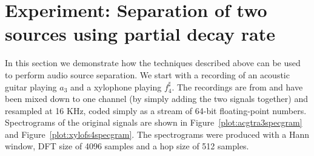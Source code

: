 \documentclass[letterpaper,12pt]{report}
\begin{document}
\section{Experiment: Separation of two sources using partial decay rate}

In this section we demonstrate how the techniques described above can be used to
perform audio source separation. We start with a recording of an acoustic guitar
playing $a_{3}$ and a xylophone playing $f_{4}^{\sharp}$. The recordings are
from \cite{opolko1987mcgill} and have been mixed down to one channel (by simply
adding the two signals together) and resampled at 16 KHz, coded simply as a
stream of 64-bit floating-point numbers. Spectrograms of the original signals are
shown in Figure~\ref{plot:acgtra3specgram} and
Figure~\ref{plot:xylofs4specgram}. The spectrograms were produced with a
Hann window, DFT size of 4096 samples and a hop size of 512 samples.
\end{document}
